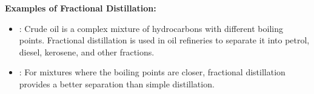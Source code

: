 \begin{example}
\textbf{Examples of Fractional Distillation:}
\begin{itemize}
    \item {}: Crude oil is a complex mixture of hydrocarbons with different boiling points. Fractional distillation is used in oil refineries to separate it into petrol, diesel, kerosene, and other fractions.
    \item {}: For mixtures where the boiling points are closer, fractional distillation provides a better separation than simple distillation.
\end{itemize}
\end{example}

